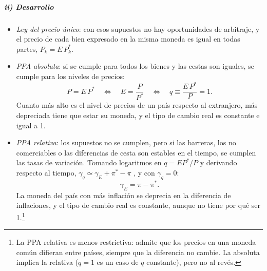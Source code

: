 \documentclass[11pt]{article}
\begin{document}
\subparagraph{ii) Desarrollo}
\begin{itemize}
\item \emph{Ley del precio único}: con esos supuestos no hay oportunidades de arbitraje, y el precio de cada bien expresado en la misma moneda es igual en todas partes, $P_k=E\,P^*_k$.
\item \emph{PPA absoluta}: si se cumple para todos los bienes y las cestas son iguales, se cumple para los niveles de precios:
  \begin{equation}\label{eq:ppa-absoluta}
  P=E\,P^*\quad\Longleftrightarrow\quad E=\frac{P}{P^*}\quad\Longleftrightarrow\quad q\equiv\frac{E\,P^*}{P}=1 .
  \end{equation}
  Cuanto más alto es el nivel de precios de un país respecto al extranjero, más depreciada tiene que estar su moneda, y el tipo de cambio real es constante e igual a 1.
\item \emph{PPA relativa}: los supuestos no se cumplen, pero si las barreras, los no comerciables o las diferencias de cesta son estables en el tiempo, se cumplen las tasas de variación. Tomando logaritmos en $q=EP^*/P$ y derivando respecto al tiempo, $\gamma_q\simeq\gamma_E+\pi^*-\pi$ , y con $\gamma_q=0$:
  \begin{equation}\label{eq:ppa-relativa}
  \gamma_E=\pi-\pi^* .
  \end{equation}
  La moneda del país con más inflación se deprecia en la diferencia de inflaciones, y el tipo de cambio real es constante, aunque no tiene por qué ser 1.\footnote{La PPA relativa es menos restrictiva: admite que los precios en una moneda común difieran entre países, siempre que la diferencia no cambie. La absoluta implica la relativa ($q=1$ es un caso de $q$ constante), pero no al revés.}
\end{itemize}
\end{document}
